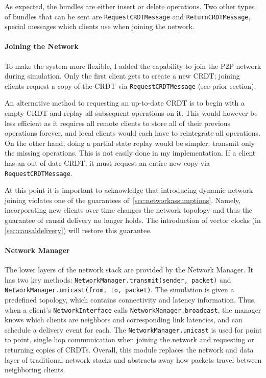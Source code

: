 \documentclass[12pt,a4paper,twoside,openright]{report}
\begin{document}
		As expected, the bundles are either insert or delete operations. Two other types of bundles that can be sent are \lstinline|RequestCRDTMessage| and \lstinline|ReturnCRDTMessage|, special messages which clients use when joining the network.
		
		\paragraph{Joining the Network} \label{sec:networkjoin}
		To make the system more flexible, I added the capability to join the P2P network during simulation. Only the first client gets to create a new CRDT; joining clients request a copy of the CRDT via \lstinline|RequestCRDTMessage| (see prior section).
		
		An alternative method to requesting an up-to-date CRDT is to begin with a empty CRDT and replay all subsequent operations on it. This would however be less efficient as it requires all remote clients to store all of their previous operations forever, and local clients would each have to reintegrate all operations. On the other hand, doing a partial state replay would be simpler: transmit only the missing operations. This is not easily done in my implementation. If a client has an out of date CRDT, it must request an entire new copy via \lstinline|RequestCRDTMessage|.
		
		At this point it is important to acknowledge that introducing dynamic network joining violates one of the guarantees of~\cref{sec:networkassumptions}. Namely, incorporating new clients over time changes the network topology and thus the guarantee of causal delivery no longer holds. The introduction of vector clocks (in \cref{sec:causaldelivery}) will restore this guarantee.
		
		\paragraph{Network Manager}
		The lower layers of the network stack are provided by the Network Manager. It has two key methods: \lstinline|NetworkManager.transmit(sender, packet)| and \lstinline|NetworkManager.unicast(from, to, packet)|. The simulation is given a predefined topology, which contains connectivity and latency information. Thus, when a client's \lstinline|NetworkInterface| calls \lstinline|NetworkManager.broadcast|, the manager knows which clients are neighbors and corresponding link latencies, and can schedule a delivery event for each. The \lstinline|NetworkManager.unicast| is used for point to point, single hop communication when joining the network and requesting or returning copies of CRDTs. Overall, this module replaces the network and data layer of traditional network stacks and abstracts away how packets travel between neighboring clients.
		
\end{document}
